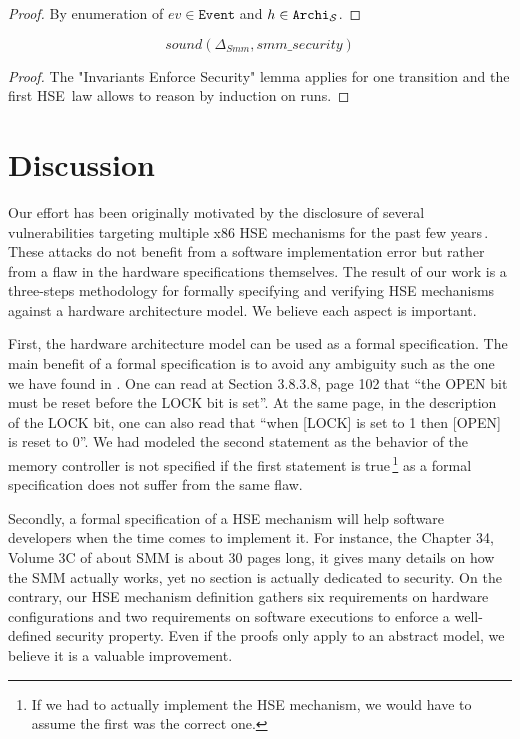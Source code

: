 \begin{proof}
  By enumeration of $ev \in \texttt{Event}$ and $h \in
  \texttt{Archi}_{\mathcal{S}}$.
\end{proof}

\begin{theorem}
\[ sound(\Delta_{Smm}, smm\_security) \]
\end{theorem}

\begin{proof}
  The "Invariants Enforce Security" lemma applies for one transition and the
  first HSE law allows to reason by induction on runs.
\end{proof}

\section{Discussion} \label{sec:speccert:discuss}

Our effort has been originally motivated by the disclosure of several
vulnerabilities targeting multiple x86 HSE mechanisms for the past few
years\,\cite{wojtczuk2009smram,duflot2009smram,rutkowska2008remap,domas2015sinkhole,kallenberg2015racecondition}. These
attacks do not benefit from a software implementation error but rather from a
flaw in the hardware specifications themselves. The result of our work is a
three-steps methodology for formally specifying and verifying HSE mechanisms
against a hardware architecture model. We believe each aspect is important.

First, the hardware architecture model can be used as a formal specification.
The main benefit of a formal specification is to avoid any ambiguity such as the
one we have found in \cite{intel2009mch}. One can read at Section 3.8.3.8,
page 102 that “the OPEN bit must be reset before the LOCK bit is set”.  At the
same page, in the description of the LOCK bit, one can also read that “when
[LOCK] is set to 1 then [OPEN] is reset to 0”. We had modeled the second
statement as the behavior of the memory controller is not specified if the
first statement is true\,\footnote{If we had to actually implement the HSE
mechanism, we would have to assume the first was the correct one.}
 as a formal specification does not suffer from the same flaw.

Secondly, a formal specification of a HSE mechanism will help software
developers when the time comes to implement it. For instance, the Chapter 34,
Volume 3C of \cite{intel2014manual} about SMM is about 30 pages long, it gives
many details on how the SMM actually works, yet no section is actually dedicated
to security. On the contrary, our HSE mechanism definition gathers six
requirements on hardware configurations and two requirements on software
executions to enforce a well-defined security property. Even if the proofs only
apply to an abstract model, we believe it is a valuable improvement.

